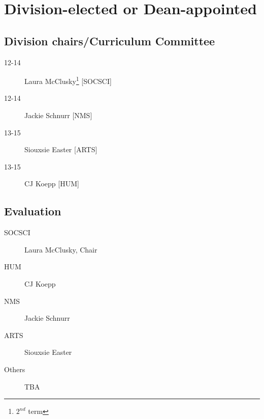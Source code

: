 \documentclass[10pt, twocolumn]{amsart}
\newcommand{\noteDivision}[1]{ [#1]}
\begin{document}
\section*{Division-elected or Dean-appointed}
\subsection*{Division chairs/Curriculum Committee}
\begin{description}
\item[12-14] Laura McClusky\footnote{$2^{nd}$ term} \noteDivision{SOCSCI}
\item[12-14] Jackie Schnurr \noteDivision{NMS}
\item[13-15] Siouxsie Easter \noteDivision{ARTS}
\item[13-15] CJ Koepp \noteDivision{HUM}
\end{description}

\subsection*{Evaluation}
\begin{description}
\item[SOCSCI] Laura McClusky, Chair
\item[HUM] CJ Koepp 
\item[NMS] Jackie Schnurr
\item[ARTS] Siouxsie Easter
\item[Others] TBA
\end{description}

%
\pagebreak
\end{document}
